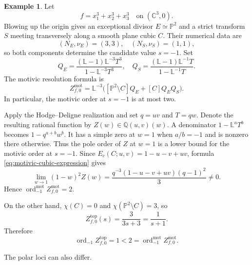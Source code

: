 \documentclass[12pt]{amsart}
\numberwithin{equation}{section}
\theoremstyle{plain}
\theoremstyle{definition}
\newtheorem{example}[theorem]{Example}
\theoremstyle{remark}
\theoremstyle{definition}
\DeclareMathOperator{\ord}{ord}
\newcommand{\Q}{\mathbb Q}
\newcommand{\Lef}{\mathbb L}
\begin{document}
\begin{example}\label{ex:motivic-cubic-cone-gap}
Let
\[
f=x_1^3+x_2^3+x_3^3
\quad\text{on }(\mathbb C^3,0).
\]
Blowing up the origin gives an exceptional divisor $E\simeq\mathbb P^2$ and a strict transform $S$ meeting transversely along a smooth plane cubic $C$. Their numerical data are
\[
(N_E,\nu_E)=(3,3),
\quad
(N_S,\nu_S)=(1,1),
\]
so both components determine the candidate value $s=-1$. Set
\[
Q_E=\frac{(\Lef-1)\Lef^{-3}T^3}{1-\Lef^{-3}T^3},
\quad
Q_S=\frac{(\Lef-1)\Lef^{-1}T}{1-\Lef^{-1}T}.
\]
The motivic resolution formula is
\begin{equation}\label{eq:motivic-cubic-expression}
Z^{\mathrm{mot}}_{f,0}
=
\Lef^{-3}\bigl([\mathbb P^2\setminus C]Q_E+[C]Q_EQ_S\bigr).
\end{equation}
In particular, the motivic order at $s=-1$ is at most two.

Apply the Hodge--Deligne realization and set $q=uv$ and $T=qw$. Denote the resulting rational function by $Z(w)\in\Q(u,v)(w)$. A denominator $1-\Lef^aT^b$ becomes $1-q^{a+b}w^b$. It has a simple zero at $w=1$ when $a/b=-1$ and is nonzero there otherwise. Thus the pole order of $Z$ at $w=1$ is a lower bound for the motivic order at $s=-1$. Since $E_c(C;u,v)=1-u-v+uv$, formula \eqref{eq:motivic-cubic-expression} gives
\[
\lim_{w\to1}(1-w)^2 Z(w) = \frac{q^{-3}(1-u-v+uv)(q-1)^2}{3}\ne0.
\]
Hence $\ord_{-1}^{\mathrm{mot}}Z^{\mathrm{mot}}_{f,0}=2$.

On the other hand, $\chi(C)=0$ and $\chi(\mathbb P^2\setminus C)=3$, so
\[
Z^{\mathrm{top}}_{f,0}(s)=\frac{3}{3s+3}=\frac{1}{s+1}.
\]
Therefore
\[
    \ord_{-1}Z^{\mathrm{top}}_{f,0} = 1 < 2 = \ord_{-1}^{\mathrm{mot}}Z^{\mathrm{mot}}_{f,0}.
\]
\end{example}

The polar loci can also differ.
\end{document}
